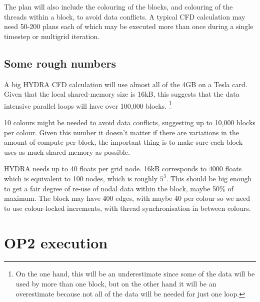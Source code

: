 \documentclass[12pt]{article}
\begin{document}
The plan will also include the colouring of the blocks, and colouring 
of the threads within a block, to avoid data conflicts.  A typical CFD 
calculation may need 50-200 plans each of which may be executed more 
than once during a single timestep or multigrid iteration.

\subsection{Some rough numbers}

A big HYDRA CFD calculation will use almost all of the 4GB 
on a Tesla card. Given that the local shared-memory size is 16kB, 
this suggests that the data intensive parallel loops will have 
over 100,000 blocks. 
\footnote{On the one hand, this will be an underestimate 
since some of the data will be used by more than one block, 
but on the other hand it will be an overestimate 
because not all of the data will be needed for just one loop.}

10 colours might be needed to avoid data conflicts, suggesting 
up to 10,000 blocks per colour.  Given this number it doesn't 
matter if there are variations in the amount of compute per 
block, the important thing is to make sure each block uses as 
much shared memory as possible.

HYDRA needs up to 40 floats per grid node.  16kB corresponds
to 4000 floats which is equivalent to 100 nodes, which is 
roughly $5^3$.  This should be big enough to get a fair degree 
of re-use of nodal data within the block, maybe 50\% of
maximum.  The block may have 400 edges, with maybe 40 per 
colour so we need to use colour-locked increments, with thread 
synchronisation in between colours.




\newpage

\section{OP2 execution}
\end{document}
